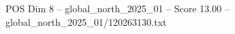 \begin{textsample}{POS Dim 8 – global\_north\_2025\_01 – Score 13.00 – global\_north\_2025\_01/120263130.txt}
\end{textsample}
